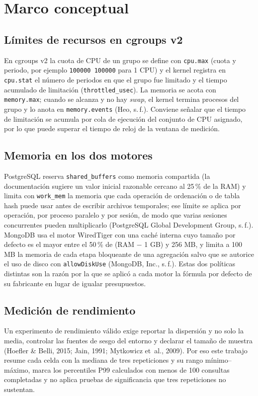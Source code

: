 \documentclass[12pt,letterpaper]{article}
\newcommand{\code}[1]{\texttt{#1}}
\newcommand{\Mongo}{MongoDB}
\newcommand{\PG}{PostgreSQL}
\begin{document}
\section{Marco conceptual}
\subsection{Límites de recursos en cgroups v2}
En cgroups v2 la cuota de CPU de un grupo se define con \code{cpu.max} (cuota y periodo, por ejemplo
\code{100000 100000} para 1 CPU) y el kernel registra en \code{cpu.stat} el número de periodos en que el grupo fue
limitado y el tiempo acumulado de limitación (\code{throttled\_usec}). La memoria se acota con \code{memory.max};
cuando se alcanza y no hay \textit{swap}, el kernel termina procesos del grupo y lo anota en \code{memory.events}
(Heo, s.\,f.). Conviene señalar que el tiempo de limitación se acumula por cola de ejecución del
conjunto de CPU asignado, por lo que puede superar el tiempo de reloj de la ventana de medición.

\subsection{Memoria en los dos motores}
\PG{} reserva \code{shared\_buffers} como memoria compartida (la documentación sugiere un valor inicial razonable
cercano al 25\,\% de la RAM) y limita con \code{work\_mem} la memoria que cada operación de ordenación o de
tabla hash puede usar antes de escribir archivos temporales; ese límite se aplica por operación, por proceso
paralelo y por sesión, de modo que varias sesiones concurrentes pueden multiplicarlo (PostgreSQL Global Development Group, s.\,f.).
\Mongo{} usa el motor WiredTiger con una caché interna cuyo tamaño por defecto es el mayor entre el 50\,\% de
(RAM $-$ 1 GB) y 256 MB, y limita a 100 MB la memoria de cada etapa bloqueante de una agregación salvo que se
autorice el uso de disco con \code{allowDiskUse} (MongoDB, Inc., s.\,f.). Estas dos políticas distintas son
la razón por la que se aplicó a cada motor la fórmula por defecto de su fabricante en lugar de igualar presupuestos.

\subsection{Medición de rendimiento}
Un experimento de rendimiento válido exige reportar la dispersión y no solo la media, controlar las fuentes de sesgo
del entorno y declarar el tamaño de muestra (Hoefler \& Belli, 2015; Jain, 1991; Mytkowicz et~al., 2009). Por eso este
trabajo resume cada celda con la mediana de tres repeticiones y su rango mínimo--máximo, marca los percentiles P99
calculados con menos de 100 consultas completadas y no aplica pruebas de significancia que tres repeticiones no
sustentan.
\end{document}
